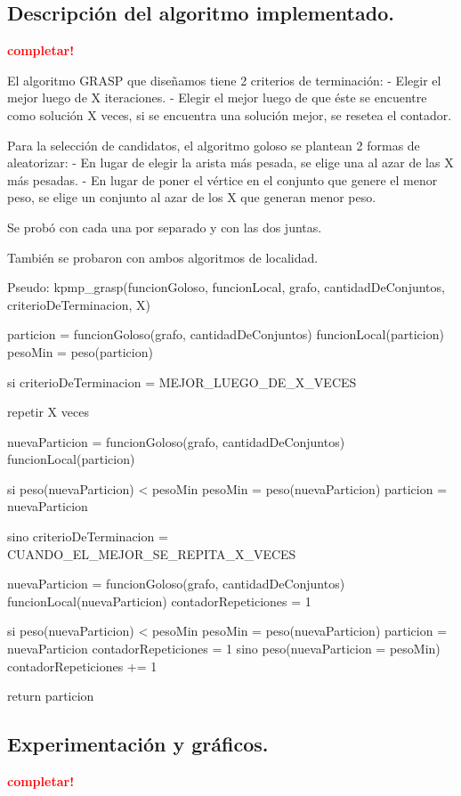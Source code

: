 \subsection{Descripción del algoritmo implementado.}
\vspace*{0.3cm}
\textcolor{red}{\textbf{completar!}}

El algoritmo GRASP que diseñamos tiene 2 criterios de terminación:
- Elegir el mejor luego de X iteraciones.
- Elegir el mejor luego de que éste se encuentre como solución X veces, si se encuentra una solución mejor, se resetea el contador.

Para la selección de candidatos, el algoritmo goloso se plantean 2 formas de aleatorizar:
- En lugar de elegir la arista más pesada, se elige una al azar de las X más pesadas.
- En lugar de poner el vértice en el conjunto que genere el menor peso, se elige un conjunto al azar de los X que generan menor peso.

Se probó con cada una por separado y con las dos juntas.

También se probaron con ambos algoritmos de localidad.

Pseudo:
kpmp_grasp(funcionGoloso, funcionLocal, grafo, cantidadDeConjuntos, criterioDeTerminacion, X) {
	particion = funcionGoloso(grafo, cantidadDeConjuntos)
	funcionLocal(particion)
	pesoMin = peso(particion)

	si criterioDeTerminacion = MEJOR_LUEGO_DE_X_VECES {
		repetir X veces {
			nuevaParticion = funcionGoloso(grafo, cantidadDeConjuntos)
			funcionLocal(particion)

			si peso(nuevaParticion) < pesoMin {
				pesoMin = peso(nuevaParticion)
				particion = nuevaParticion
			}
		}
	} sino criterioDeTerminacion = CUANDO_EL_MEJOR_SE_REPITA_X_VECES {
		nuevaParticion = funcionGoloso(grafo, cantidadDeConjuntos)
		funcionLocal(nuevaParticion)
		contadorRepeticiones = 1

		si peso(nuevaParticion) < pesoMin {
			pesoMin = peso(nuevaParticion)
			particion = nuevaParticion
			contadorRepeticiones = 1
		} sino peso(nuevaParticion = pesoMin) {
			contadorRepeticiones += 1
		}
	}

	return particion
}

\newpage
\subsection{Experimentación y gráficos.}
\vspace*{0.3cm}
\textcolor{red}{\textbf{completar!}}
